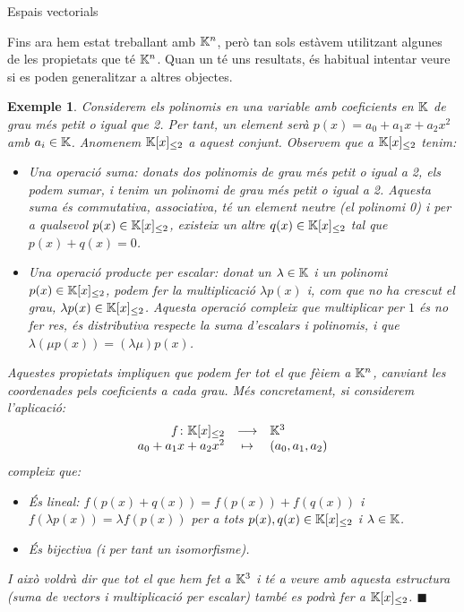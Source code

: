 \documentclass[
  11pt,
]{book}
\makeatletter
\numberwithin{dummy}{section}
\theoremstyle{maincolornumbox}
\theoremstyle{blacknumex}
\newtheorem{exampleT}{Exemple}[chapter]
\theoremstyle{blacknumbox}
\theoremstyle{maincolornum}
\newenvironment{example}{\begin{exampleT}}{\hfill{\tiny\ensuremath{\blacksquare}}\end{exampleT}}
\renewcommand{\section}{\@startsection{section}{1}{\z@}
{-4ex \@plus -1ex \@minus -.4ex}
{1ex \@plus.2ex }
{\normalfont\large\sffamily\bfseries}}
\newlength\esp
\makeatother
\begin{document}
\hypertarget{espais-vectorials}{%
\section{Espais vectorials}\label{espais-vectorials}}

Fins ara hem estat treballant amb \(\mathbb{K}^n\), però tan sols estàvem
utilitzant algunes de les propietats que té \(\mathbb{K}^n\). Quan un té uns
resultats, és habitual intentar veure si es poden generalitzar a altres
objectes.

\begin{example}
Considerem els polinomis en una variable amb coeficients en \(\mathbb{K}\) de grau
més petit o igual que 2. Per tant, un element serà
\(p(x)=a_0+a_1x+a_2x^2\) amb \(a_i\in \mathbb{K}\). Anomenem \(\mathbb{K}[x]_{\leq2}\) a
aquest conjunt. Observem que a \(\mathbb{K}[x]_{\leq2}\) tenim:

\begin{itemize}
\item
  Una operació suma: donats dos polinomis de grau més petit o igual a
  2, els podem sumar, i tenim un polinomi de grau més petit o igual
  a 2. Aquesta suma és commutativa, associativa, té un element neutre
  (el polinomi 0) i per a qualsevol \(p(x)\in\mathbb{K}[x]_{\leq2}\), existeix
  un altre \(q(x)\in\mathbb{K}[x]_{\leq2}\) tal que \(p(x)+q(x)=0\).
\item
  Una operació producte per escalar: donat un \(\lambda \in \mathbb{K}\) i un
  polinomi \(p(x)\in\mathbb{K}[x]_{\leq2}\), podem fer la multiplicació
  \(\lambda p(x)\) i, com que no ha crescut el grau,
  \(\lambda p(x)\in\mathbb{K}[x]_{\leq2}\). Aquesta operació compleix que
  multiplicar per \(1\) és no fer res, és distributiva respecte la suma
  d'escalars i polinomis, i que \(\lambda(\mu p(x))=(\lambda\mu)p(x)\).
\end{itemize}

Aquestes propietats impliquen que podem fer tot el que fèiem a \(\mathbb{K}^n\),
canviant les coordenades pels coeficients a cada grau. Més concretament,
si considerem l'aplicació: \[\begin{array}{rcl}
 f\colon \mathbb{K}[x]_{\leq2} & \longrightarrow & \mathbb{K}^3 \\
     a_0+a_1x+a_2x^2 & \mapsto & (a_0,a_1,a_2)
    \end{array}\] compleix que:

\begin{itemize}
\item
  És lineal: \(f(p(x)+q(x))=f(p(x))+f(q(x))\) i
  \(f(\lambda p(x))=\lambda f(p(x))\) per a tots
  \(p(x),q(x)\in \mathbb{K}[x]_{\leq2}\) i \(\lambda \in \mathbb{K}\).
\item
  És bijectiva (i per tant un isomorfisme).
\end{itemize}

I això voldrà dir que tot el que hem fet a \(\mathbb{K}^3\) i té a veure amb
aquesta estructura (suma de vectors i multiplicació per escalar) també
es podrà fer a \(\mathbb{K}[x]_{\leq2}\).
\end{example}
\end{document}
